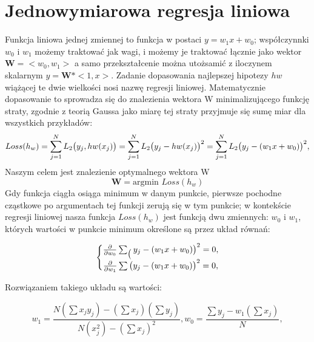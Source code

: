 
\chapter{ Jednowymiarowa regresja liniowa}
\cite{russell2023} Funkcja liniowa jednej zmiennej to funkcja w postaci \(y=w_1x +w_0\); współczynnki \(w_0\) i \(w_1\) możemy traktować jak wagi, i możemy je traktować łącznie jako wektor \(\textbf{W}=<w_0,w_1>\) a samo przekształcenie można utożsamić z iloczynem skalarnym \(y=\textbf{W}*<1,x> \). Zadanie dopasowania najlepszej hipotezy \(hw\) wiążącej te dwie wielkości nosi nazwę regresji liniowej. Matematycznie dopasowanie to sprowadza się do znalezienia wektora W minimalizującego funkcję straty, zgodnie z teorią Gaussa jako miarę tej straty przyjmuje się sumę miar dla wszystkich przykładów:
\begin{equation}
       Loss(h_w) = \sum_{j=1}^{N} L_2 \big{(}y_j, hw(x_j)\big{)} = \sum_{j=1}^{N} L_2 \big{(}y_j-hw(x_j)\big{)}^2 =
       \sum_{j=1}^{N} L_2 \big{(}y_j-(w_1x + w_0)\big{)}^2,
\end{equation}
Naszym celem jest znalezienie optymalnego wektora W 
\begin{equation}
       \textbf{W} = \text{argmin } Loss(h_w)
\end{equation}
Gdy funkcja ciągła osiąga minimum w danym punkcie, pierwsze pochodne cząstkowe po argumentach tej funkcji zerują się w tym punkcie; w kontekście regresji liniowej nasza funkcja \(Loss(h_w)\) jest funkcją dwu zmiennych: \(w_0\) i \(w_1\), których wartości w punkcie minimum określone są przez układ równań:
 

    \begin{equation}
        \Biggl\{
                \begin{matrix}
                    \frac{\partial}{\partial{w_0}} \sum_ \big{(}y_j -(w_1x + w_0)\big{)}^2 = 0,\\
                     
                    \frac{\partial}{\partial{w_1}} \sum \big{(}y_j -(w_1x + w_0)\big{)}^2 = 0,
                \end{matrix} 
    \end{equation} 

Rozwiązaniem takiego układu są wartości:

\begin{equation}
w_1=\frac{ N(\sum x_jy_j)-(\sum x_j)(\sum y_j) }{ N(x_j^2)-(\sum x_j)^2 }, 
w_0=\frac{\sum y_j - w_1( \sum x_j)}{N},
\end{equation}

